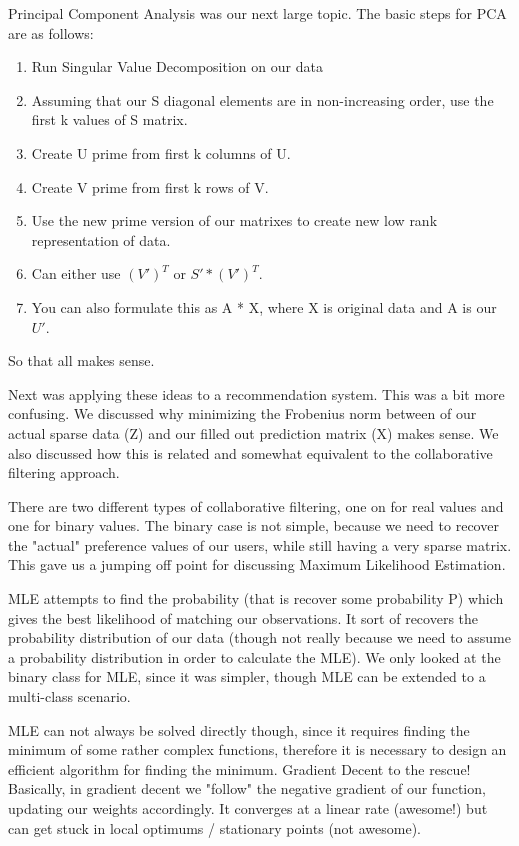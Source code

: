 \documentclass[12pt]{article}
\begin{document}
    Principal Component Analysis was our next large topic. The basic steps for PCA are as follows:
    \begin{enumerate}
        \item Run Singular Value Decomposition on our data
        \item Assuming that our S diagonal elements are in non-increasing order, use the first k values of S matrix.
        \item Create U prime from first k columns of U.
        \item Create V prime from first k rows of V.
        \item Use the new prime version of our matrixes to create new low rank representation of data.
        \item Can either use \((V')^T\) or \(S'*(V')^T\).
        \item You can also formulate this as A * X, where X is original data and A is our \(U'\).
    \end{enumerate}
    So that all makes sense.

    Next was applying these ideas to a recommendation system. This was a bit more confusing.
    We discussed why minimizing the Frobenius norm between of our actual sparse data (Z) and our filled out 
    prediction matrix (X) makes sense. We also discussed how this is related and somewhat equivalent to the collaborative
    filtering approach.

    There are two different types of collaborative filtering, one on for real values and one for binary values.
    The binary case is not simple, because we need to recover the "actual" preference values of our users, while still
    having a very sparse matrix. This gave us a jumping off point for discussing Maximum Likelihood Estimation.

    MLE attempts to find the probability (that is recover some probability P) which gives the best likelihood of
    matching our observations. It sort of recovers the probability distribution of our data (though not really because
    we need to assume a probability distribution in order to calculate the MLE). We only looked at the binary class for MLE, 
    since it was simpler, though MLE can be extended to a multi-class scenario.

    MLE can not always be solved directly though, since it requires finding the minimum of some rather complex functions, therefore
    it is necessary to design an efficient algorithm for finding the minimum. Gradient Decent to the rescue! Basically,
    in gradient decent we "follow" the negative gradient of our function, updating our weights accordingly. It converges
    at a linear rate (awesome!) but can get stuck in local optimums / stationary points (not awesome).
    
\end{document}
